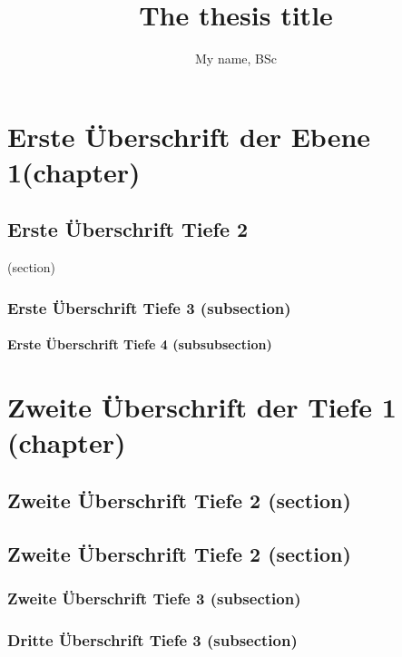 \documentclass[Master, BBE, english]{twbook}
\title{The thesis title}
\author{My name, BSc}
\begin{document}
\maketitle

\Blinddocument

\chapter{Erste Überschrift der Ebene 1(chapter)}
\blinddocument

\blindmathpaper

\section{Erste Überschrift Tiefe 2}(section)
\blindtext 

\subsection{Erste Überschrift Tiefe 3 (subsection)}
\blindtext 

\subsubsection{Erste Überschrift Tiefe 4 (subsubsection)}
\blindtext

\chapter{Zweite Überschrift der Tiefe 1 (chapter)}
\blindtext  

\section{Zweite Überschrift Tiefe 2 (section)}
\blindtext  

\section{Zweite Überschrift Tiefe 2 (section)}
\blindtext 

\subsection{Zweite Überschrift Tiefe 3 (subsection)}
\blindtext 

\subsection{Dritte Überschrift Tiefe 3 (subsection)}
\blindtext 
 
\end{document}
